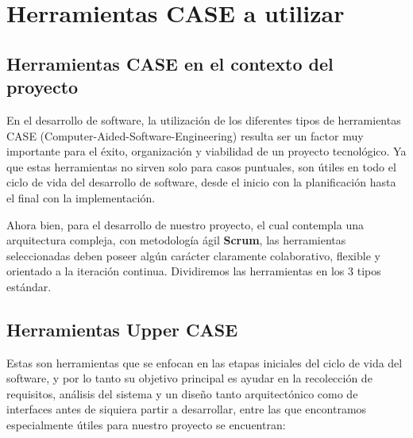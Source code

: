 \chapter{Herramientas CASE a utilizar}
\label{Herramientas CASE}

\section{Herramientas CASE en el contexto del proyecto} 

En  el desarrollo de software, la utilización de los diferentes tipos de herramientas CASE (Computer-Aided-Software-Engineering) resulta ser un factor muy importante para el éxito, organización y viabilidad de un proyecto tecnológico. Ya que estas herramientas no sirven solo para casos puntuales, son útiles en todo el ciclo de vida del desarrollo de software, desde el inicio con la planificación hasta el  final con la implementación.

Ahora bien, para el desarrollo de nuestro proyecto, el cual contempla una arquitectura compleja, con metodología ágil \textbf{Scrum}, las herramientas seleccionadas deben poseer algún carácter claramente colaborativo, flexible y orientado a la iteración continua. Dividiremos las herramientas en los 3 tipos estándar.

\section{Herramientas Upper CASE}

Estas son herramientas que se enfocan en las etapas iniciales del ciclo de vida del software, y por lo tanto su objetivo principal es ayudar en la recolección de requisitos, análisis del sistema y un diseño tanto arquitectónico como de interfaces antes de siquiera partir a desarrollar, entre las que encontramos especialmente útiles para nuestro proyecto se encuentran:

